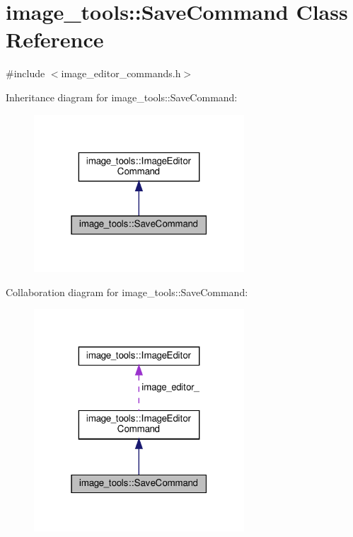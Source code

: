 \hypertarget{classimage__tools_1_1SaveCommand}{}\section{image\+\_\+tools\+:\+:Save\+Command Class Reference}
\label{classimage__tools_1_1SaveCommand}


{\ttfamily \#include $<$image\+\_\+editor\+\_\+commands.\+h$>$}



Inheritance diagram for image\+\_\+tools\+:\+:Save\+Command\+:
\nopagebreak
\begin{figure}[H]
\begin{center}
\leavevmode
\includegraphics[width=223pt]{classimage__tools_1_1SaveCommand__inherit__graph}
\end{center}
\end{figure}


Collaboration diagram for image\+\_\+tools\+:\+:Save\+Command\+:
\nopagebreak
\begin{figure}[H]
\begin{center}
\leavevmode
\includegraphics[width=223pt]{classimage__tools_1_1SaveCommand__coll__graph}
\end{center}
\end{figure}
